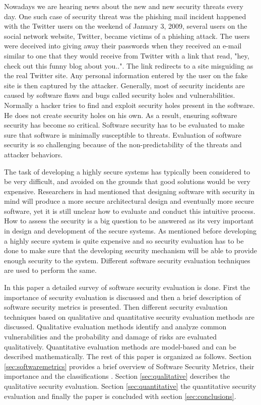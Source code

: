 \documentclass[pdftex,english,oribibl]{llncs}
\begin{document}
  Nowadays we are hearing news about the new and new security threats every day. One such case of security threat was the phishing mail incident happened with the Twitter users on the weekend of January 3, 2009, several users on the social network website, Twitter, became victims of a phishing attack. The users were deceived into giving away their passwords when they received an e-mail similar to one that they would receive from Twitter with a link that read, "hey, check out this funny blog about you..". The link redirects to a site misguiding as the real Twitter site. Any personal information entered by the user on the fake site is then captured by the attacker. Generally, most of security incidents are caused by software flaws and bugs called security holes and vulnerabilities. Normally a hacker tries to find and exploit security holes present in the software. He does not create security holes on his own. As a result, ensuring software security has become so critical. Software security has to be evaluated to make sure that software is minimally susceptible to threats. Evaluation of software security is so challenging because of the non-predictability of the threats and attacker behaviors. 
  
  The task of developing a highly secure systems has typically been considered to be very difficult, and avoided on the grounds that good solutions would be very expensive. Researchers in \cite{5564015} had mentioned that designing software with security in mind will produce a more secure architectural design and eventually more secure software, yet it is still unclear how to evaluate and conduct this intuitive process. How to assess the security is a big question to be answered as its very important in design and development of the secure systems. As mentioned before developing a highly secure system is quite expensive and so security evaluation has to be done to make sure that the developing security mechanism will be able to provide enough security to the system. Different software security evaluation techniques are used to perform the same.

  In this paper a detailed survey of software security evaluation is done. First the importance of security evaluation is discussed and then a brief description of software security metrics is presented. Then different security evaluation techniques based on qualitative and quantitative security evaluation methods are discussed. Qualitative evaluation methods identify and analyze common vulnerabilities and the probability and damage of risks are evaluated qualitatively. Quantitative evaluation methods are model-based and can be described mathematically. The rest of this paper is organized as follows. Section \ref{sec:softwaremetrics} provides a brief overview of Software Security Metrics, their importance and the classifications . Section \ref{sec:qualitative} describes the qualitative security evaluation. Section \ref{sec:quantitative} the quantitative security evaluation and finally the paper is concluded with section \ref{sec:conclusions}.
\end{document}
